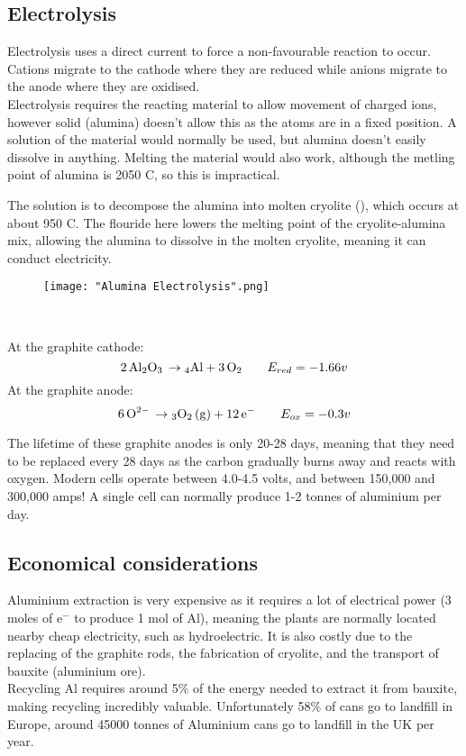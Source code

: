 \documentclass[a4paper, 12pt]{article}
\begin{document}
		\subsection{Electrolysis}
			Electrolysis uses a direct current to force a non-favourable reaction to occur. Cations migrate to the cathode where they are reduced while anions migrate to the anode where they are oxidised. \\
			Electrolysis requires the reacting material to allow movement of charged ions, however solid  (alumina) doesn't allow this as the atoms are in a fixed position. A solution of the material would normally be used, but alumina doesn't easily dissolve in anything. Melting the material would also work, although the metling point of alumina is 2050 \degree C, so this is impractical. \\
			\par
			The solution is to decompose the alumina into molten cryolite (), which occurs at about 950 \degree C. The flouride here lowers the melting point of the cryolite-alumina mix, allowing the alumina to dissolve in the molten cryolite, meaning it can conduct electricity. 
			\begin{figure}[!ht]
				\centering
				\texttt{[image: "Alumina Electrolysis".png]}
			\end{figure}
			\\
			\par
			At the graphite cathode:
			\[ \ce{2Al2O3 \rightarrow 4Al + 3O2} \qquad E_{red}=-1.66v \]
			At the graphite anode:
			\[ \ce{6O^2- \rightarrow 3O2 (g) + 12e-} \qquad E_{ox}= -0.3v \]

			The lifetime of these graphite anodes is only 20-28 days, meaning that they need to be replaced every 28 days as the carbon gradually burns away and reacts with oxygen. Modern cells operate between 4.0-4.5 volts, and between 150,000 and 300,000 amps! A single cell can normally produce 1-2 tonnes of aluminium per day.
			
			\subsection{Economical considerations}
				Aluminium extraction is very expensive as it requires a lot of electrical power (3 moles of e$^-$ to produce 1 mol of Al), meaning the plants are normally located nearby cheap electricity, such as hydroelectric. It is also costly due to the replacing of the graphite rods, the fabrication of cryolite, and the transport of bauxite (aluminium ore). \\
				Recycling Al requires around 5\% of the energy needed to extract it from bauxite, making recycling incredibly valuable. Unfortunately 58\% of cans go to landfill in Europe, around 45000 tonnes of Aluminium cans go to landfill in the UK per year.
				
\end{document}
